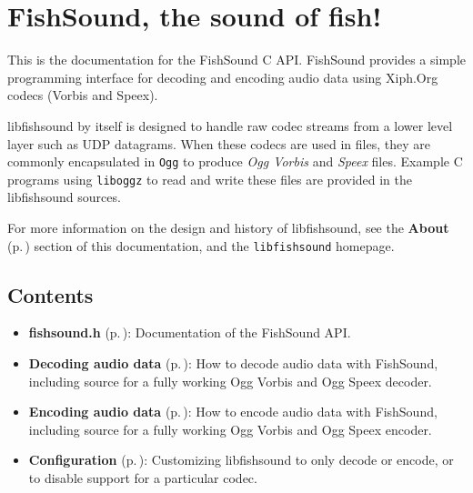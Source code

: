 \section{Fish\-Sound, the sound of fish!}\label{index_intro}
This is the documentation for the Fish\-Sound C API. Fish\-Sound provides a simple programming interface for decoding and encoding audio data using Xiph.Org codecs (Vorbis and Speex).

libfishsound by itself is designed to handle raw codec streams from a lower level layer such as UDP datagrams. When these codecs are used in files, they are commonly encapsulated in {\tt Ogg} to produce {\em Ogg Vorbis\/} and {\em Speex\/} files. Example C programs using {\tt liboggz} to read and write these files are provided in the libfishsound sources.

For more information on the design and history of libfishsound, see the {\bf About }{\rm (p.\,\pageref{group__about})} section of this documentation, and the {\tt libfishsound} homepage.\subsection{Contents}\label{index_contents}
\begin{itemize}
\item {\bf fishsound.h }{\rm (p.\,\pageref{fishsound_8h})}: Documentation of the Fish\-Sound API.\end{itemize}


\begin{itemize}
\item {\bf Decoding audio data }{\rm (p.\,\pageref{group__decode})}: How to decode audio data with Fish\-Sound, including source for a fully working Ogg Vorbis and Ogg Speex decoder.\end{itemize}


\begin{itemize}
\item {\bf Encoding audio data }{\rm (p.\,\pageref{group__encode})}: How to encode audio data with Fish\-Sound, including source for a fully working Ogg Vorbis and Ogg Speex encoder.\end{itemize}


\begin{itemize}
\item {\bf Configuration }{\rm (p.\,\pageref{group__configuration})}: Customizing libfishsound to only decode or encode, or to disable support for a particular codec.\end{itemize}


